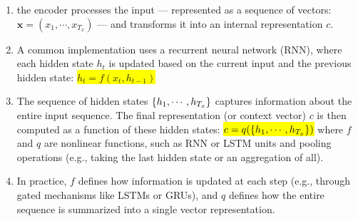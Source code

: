 \begin{enumerate}
    \item the encoder processes the input — represented as a sequence of vectors: $\bm{x}=(x_1,\cdots,x_{T_x})$ — and transforms it into an internal representation $c$.
    \hfill \cite{arxiv/1409.0473/NMT-Jointly-Learning-Align-Translate, common/online/chatgpt}

    \item A common implementation uses a recurrent neural network (RNN), where each hidden state $h_t$ is updated based on the current input and the previous hidden state: 
    \colorbox{yellow}{$h_t=f(x_t,h_{t-1})$}
    \hfill \cite{arxiv/1409.0473/NMT-Jointly-Learning-Align-Translate, common/online/chatgpt}

    \item The sequence of hidden states $\left\{h_1,\cdots,h_{T_x}\right\}$ captures information about the entire input sequence.
    The final representation (or context vector) $c$ is then computed as a function of these hidden states: \colorbox{yellow}{$c=q(\left\{h_1,\cdots,h_{T_x}\right\})$} 
    where $f$ and $q$ are nonlinear functions, such as RNN or LSTM units and pooling operations (e.g., taking the last hidden state or an aggregation of all).
    \hfill \cite{arxiv/1409.0473/NMT-Jointly-Learning-Align-Translate, common/online/chatgpt}

    \item In practice, $f$ defines how information is updated at each step (e.g., through gated mechanisms like LSTMs or GRUs), and $q$ defines how the entire sequence is summarized into a single vector representation.
    \hfill \cite{arxiv/1409.0473/NMT-Jointly-Learning-Align-Translate, common/online/chatgpt}
\end{enumerate}











